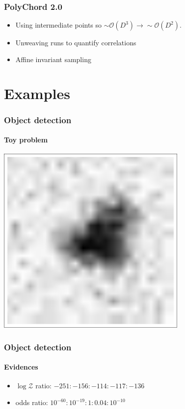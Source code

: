 \documentclass[]{beamer}
\newcommand{\ev}{\mathcal{Z}}
\begin{document}
\begin{frame}
  \frametitle{PolyChord 2.0}
  \begin{itemize}
    \pause\item Using intermediate points so $\sim\mathcal{O}(D^3)\to\sim\mathcal{O}(D^2)$.
    \pause\item Unweaving runs to quantify correlations
    \pause\item Affine invariant sampling
  \end{itemize}
\end{frame}


\section{Examples}

\begin{frame}
  \frametitle{Object detection}
  \framesubtitle{Toy problem}

  \centerline{%
  \includegraphics[width=0.7\textwidth]{figures/object_detection_image}
}

\end{frame}

\begin{frame}
  \frametitle{Object detection}
  \framesubtitle{Evidences}

  \begin{itemize}
      \pause
    \item $\log\ev$ ratio: $-251:-156:-114:-117:-136$
      \pause
    \item odds ratio: $10^{-60}:10^{-19}:1:0.04:10^{-10}$
  \end{itemize}

\end{frame}
\end{document}
